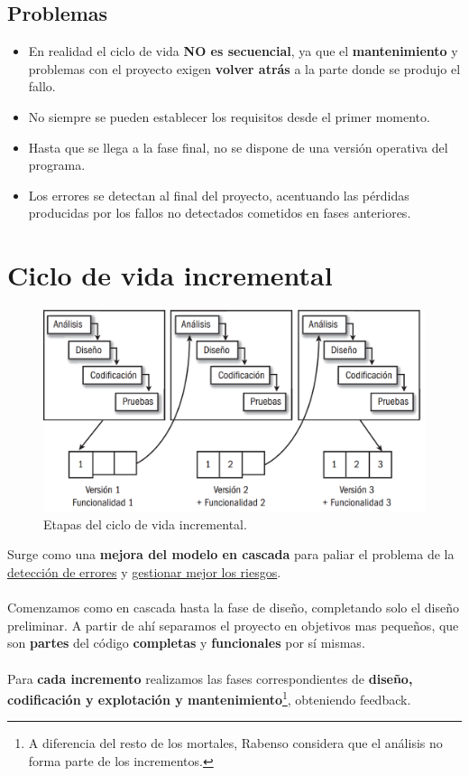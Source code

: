  \subsection{Problemas}
 \begin{itemize}
     \item En realidad el ciclo de vida \textbf{NO es secuencial}, ya que el \textbf{mantenimiento} y problemas con el proyecto exigen \textbf{volver atrás} a la parte donde se produjo el fallo. %
     \item No siempre se pueden establecer los requisitos desde el primer momento. 
     \item Hasta que se llega a la fase final, no se dispone de una versión operativa del programa. 
     \item Los errores se detectan al final del proyecto, acentuando las pérdidas producidas por los fallos no detectados cometidos en fases anteriores.
 \end{itemize}
 
 \section{Ciclo de vida incremental} %
\begin{figure}[H]
  \centering
  \includegraphics[width=0.7\linewidth]{Resources/cicloIncremental.png}
  \caption{Etapas del ciclo de vida incremental.}
  \label{fig:procesoIncremental}
\end{figure}

Surge como una \textbf{mejora del modelo en cascada} para paliar el problema de la \uline{detección de errores} y \uline{gestionar mejor los riesgos}.\\\\
Comenzamos como en cascada hasta la fase de diseño, completando solo el diseño preliminar. A partir de ahí separamos el proyecto en objetivos mas pequeños, que son \textbf{partes} del código \textbf{completas} y \textbf{funcionales} por sí mismas.\\\\
Para \textbf{cada incremento} realizamos las fases correspondientes de \textbf{diseño, codificación y explotación y mantenimiento}\footnote{A diferencia del resto de los mortales, Rabenso considera que el análisis no forma parte de los incrementos.}, obteniendo feedback.

